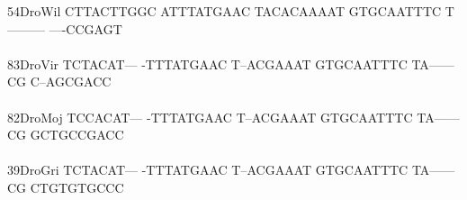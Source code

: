 \documentclass[11pt,twoside,reqno,a4paper]{article}
\begin{document}
{54\hspace*{2\charwidth}DroWil	CTTACTTGGC	ATTTATGAAC	TACACAAAAT	GTGCAATTTC	T---------	----CCGAGT	\\
\hspace*{4\charwidth}\hspace*{7\charwidth}\hspace*{1\charwidth}\hspace*{1\charwidth}\hspace*{1\charwidth}\hspace*{1\charwidth}\hspace*{1\charwidth}\hspace*{1\charwidth}\\
83\hspace*{2\charwidth}DroVir	TCTACAT---	-TTTATGAAC	T--ACGAAAT	GTGCAATTTC	TA------CG	C--AGCGACC	\\
\hspace*{4\charwidth}\hspace*{7\charwidth}\hspace*{1\charwidth}\hspace*{1\charwidth}\hspace*{1\charwidth}\hspace*{1\charwidth}\hspace*{1\charwidth}\hspace*{1\charwidth}\\
82\hspace*{2\charwidth}DroMoj	TCCACAT---	-TTTATGAAC	T--ACGAAAT	GTGCAATTTC	TA------CG	GCTGCCGACC	\\
\hspace*{4\charwidth}\hspace*{7\charwidth}\hspace*{1\charwidth}\hspace*{1\charwidth}\hspace*{1\charwidth}\hspace*{1\charwidth}\hspace*{1\charwidth}\hspace*{1\charwidth}\\
39\hspace*{2\charwidth}DroGri	TCTACAT---	-TTTATGAAC	T--ACGAAAT	GTGCAATTTC	TA------CG	CTGTGTGCCC	\\
\hspace*{4\charwidth}\hspace*{7\charwidth}\hspace*{1\charwidth}\hspace*{1\charwidth}\hspace*{1\charwidth}\hspace*{1\charwidth}\hspace*{1\charwidth}\hspace*{1\charwidth}\\
}
\end{document}
